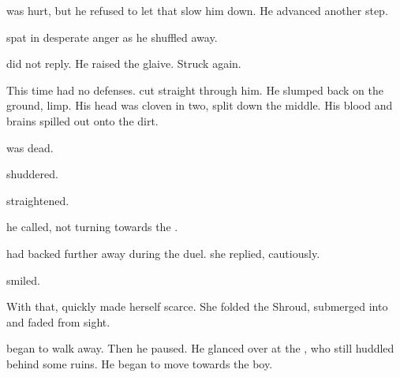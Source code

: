 \begin{garbage}

\Ishnaruchaefir{} was hurt, but he refused to let that slow him down. 
He advanced another step. 

\Teshrial{} spat in desperate anger as he shuffled away. 

\Ishnaruchaefir{} did not reply. 
He raised the glaive. 
Struck again. 

This time \Teshrial{} had no defenses. 
\Rystessakhin{} cut straight through him. 
He slumped back on the ground, limp. 
His head was cloven in two, split down the middle. 
His blood and brains spilled out onto the dirt. 

\Teshrial{} was dead. 

\Criseis{} shuddered. 

\Ishnaruchaefir{} straightened. 

 he called, not turning towards the \resvil. 

\Achsah{} had backed further away during the duel. 
\ta{\Ishnaruchaefir,} she replied, cautiously. 

\Ishnaruchaefir{} smiled.

With that, \Achsah{} quickly made herself scarce. 
She folded the Shroud, submerged into \Nyx{} and faded from sight. 

\Ishnaruchaefir{} began to walk away. 
Then he paused.
He glanced over at the \human, who still huddled behind some ruins. 
He began to move towards the boy. 



\end{garbage}
